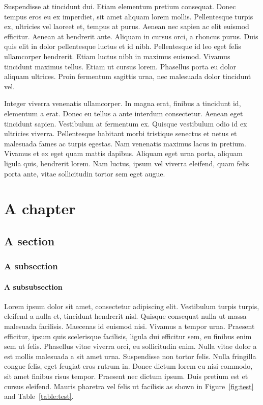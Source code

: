 \documentclass{abe}
\begin{document}
Suspendisse at tincidunt dui. Etiam elementum pretium consequat. Donec tempus eros eu ex imperdiet, sit amet aliquam lorem mollis. Pellentesque turpis ex, ultricies vel laoreet et, tempus at purus. Aenean nec sapien ac elit euismod efficitur. Aenean at hendrerit ante. Aliquam in cursus orci, a rhoncus purus. Duis quis elit in dolor pellentesque luctus et id nibh. Pellentesque id leo eget felis ullamcorper hendrerit. Etiam luctus nibh in maximus euismod. Vivamus tincidunt maximus tellus. Etiam ut cursus lorem. Phasellus porta eu dolor aliquam ultrices. Proin fermentum sagittis urna, nec malesuada dolor tincidunt vel.

Integer viverra venenatis ullamcorper. In magna erat, finibus a tincidunt id, elementum a erat. Donec eu tellus a ante interdum consectetur. Aenean eget tincidunt sapien. Vestibulum at fermentum ex. Quisque vestibulum odio id ex ultricies viverra. Pellentesque habitant morbi tristique senectus et netus et malesuada fames ac turpis egestas. Nam venenatis maximus lacus in pretium. Vivamus et ex eget quam mattis dapibus. Aliquam eget urna porta, aliquam ligula quis, hendrerit lorem. Nam luctus, ipsum vel viverra eleifend, quam felis porta ante, vitae sollicitudin tortor sem eget augue.

\mainmatter%

\chapter{A chapter}
\section{A section}
\subsection{A subsection}
\subsubsection{A subsubsection}
Lorem ipsum dolor sit amet, consectetur adipiscing elit. Vestibulum turpis turpis, eleifend a nulla et, tincidunt hendrerit nisl. Quisque consequat nulla ut massa malesuada facilisis. Maecenas id euismod nisi. Vivamus a tempor urna. Praesent efficitur, ipsum quis scelerisque facilisis, ligula dui efficitur sem, eu finibus enim sem ut felis. Phasellus vitae viverra orci, eu sollicitudin enim. Nulla vitae dolor a est mollis malesuada a sit amet urna. Suspendisse non tortor felis. Nulla fringilla congue felis, eget feugiat eros rutrum in. Donec dictum lorem eu nisi commodo, sit amet finibus risus tempor. Praesent nec dictum ipsum. Duis pretium est et cursus eleifend. Mauris pharetra vel felis ut facilisis as shown in Figure~\ref{fig:test} and Table~\ref{table:test}.
\end{document}
